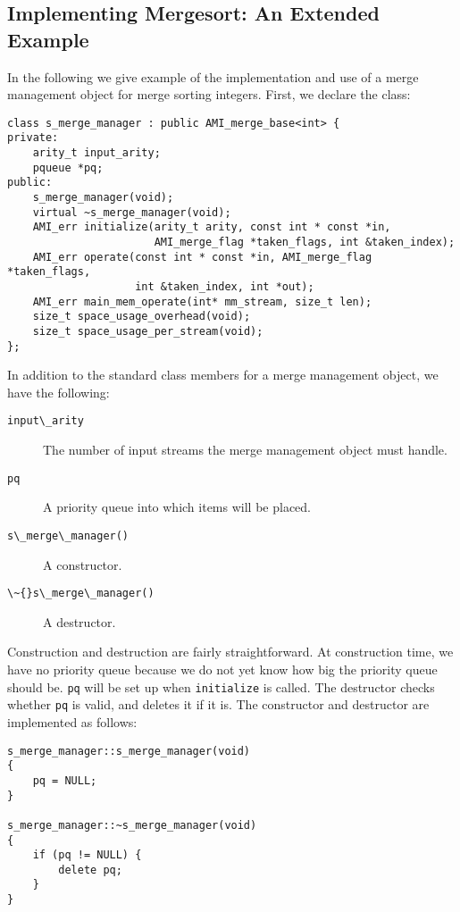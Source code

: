 \subsection{Implementing Mergesort: An Extended Example}
\label{sec:mergesort}

In the following we give example of the implementation and use of a merge
management object for merge sorting integers. First, we declare the class:


\begin{verbatim}
class s_merge_manager : public AMI_merge_base<int> { 
private:
    arity_t input_arity;
    pqueue *pq;
public:
    s_merge_manager(void);
    virtual ~s_merge_manager(void);
    AMI_err initialize(arity_t arity, const int * const *in,
                       AMI_merge_flag *taken_flags, int &taken_index);
    AMI_err operate(const int * const *in, AMI_merge_flag *taken_flags,
                    int &taken_index, int *out);
    AMI_err main_mem_operate(int* mm_stream, size_t len);
    size_t space_usage_overhead(void);
    size_t space_usage_per_stream(void);
};
\end{verbatim}

In addition to the standard class members for a merge management
object, we have the following:

\begin{description}
\item[\verb|input\_arity|]
The number of input streams the merge management object must handle.
\item[\verb|pq|]
A priority queue into which items will be placed.
\item[\verb|s\_merge\_manager()|]
A constructor.
\item[\verb|\~{}s\_merge\_manager()|]
A destructor.
\end{description}

Construction and destruction are fairly straightforward.  At construction
time, we have no priority queue because we do not yet know how big the
priority queue should be.  \verb|pq| will be set up when \verb|initialize|
is called.  The destructor checks whether
\verb|pq| is valid, and deletes it if it is.  The constructor and
destructor are implemented as follows:

\begin{verbatim}
s_merge_manager::s_merge_manager(void)
{
    pq = NULL;
}

s_merge_manager::~s_merge_manager(void)
{
    if (pq != NULL) {
        delete pq;
    }
}
\end{verbatim}

